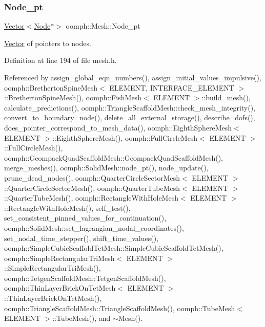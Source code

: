 \subsubsection{\texorpdfstring{Node\+\_\+pt}{Node\_pt}}
{\footnotesize\ttfamily \hyperlink{classoomph_1_1Vector}{Vector}$<$\hyperlink{classoomph_1_1Node}{Node}$\ast$$>$ oomph\+::\+Mesh\+::\+Node\+\_\+pt\hspace{0.3cm}{\ttfamily [protected]}}



\hyperlink{classoomph_1_1Vector}{Vector} of pointers to nodes. 



Definition at line 194 of file mesh.\+h.



Referenced by assign\+\_\+global\+\_\+eqn\+\_\+numbers(), assign\+\_\+initial\+\_\+values\+\_\+impulsive(), oomph\+::\+Bretherton\+Spine\+Mesh$<$ E\+L\+E\+M\+E\+N\+T, I\+N\+T\+E\+R\+F\+A\+C\+E\+\_\+\+E\+L\+E\+M\+E\+N\+T $>$\+::\+Bretherton\+Spine\+Mesh(), oomph\+::\+Fish\+Mesh$<$ E\+L\+E\+M\+E\+N\+T $>$\+::build\+\_\+mesh(), calculate\+\_\+predictions(), oomph\+::\+Triangle\+Scaffold\+Mesh\+::check\+\_\+mesh\+\_\+integrity(), convert\+\_\+to\+\_\+boundary\+\_\+node(), delete\+\_\+all\+\_\+external\+\_\+storage(), describe\+\_\+dofs(), does\+\_\+pointer\+\_\+correspond\+\_\+to\+\_\+mesh\+\_\+data(), oomph\+::\+Eighth\+Sphere\+Mesh$<$ E\+L\+E\+M\+E\+N\+T $>$\+::\+Eighth\+Sphere\+Mesh(), oomph\+::\+Full\+Circle\+Mesh$<$ E\+L\+E\+M\+E\+N\+T $>$\+::\+Full\+Circle\+Mesh(), oomph\+::\+Geompack\+Quad\+Scaffold\+Mesh\+::\+Geompack\+Quad\+Scaffold\+Mesh(), merge\+\_\+meshes(), oomph\+::\+Solid\+Mesh\+::node\+\_\+pt(), node\+\_\+update(), prune\+\_\+dead\+\_\+nodes(), oomph\+::\+Quarter\+Circle\+Sector\+Mesh$<$ E\+L\+E\+M\+E\+N\+T $>$\+::\+Quarter\+Circle\+Sector\+Mesh(), oomph\+::\+Quarter\+Tube\+Mesh$<$ E\+L\+E\+M\+E\+N\+T $>$\+::\+Quarter\+Tube\+Mesh(), oomph\+::\+Rectangle\+With\+Hole\+Mesh$<$ E\+L\+E\+M\+E\+N\+T $>$\+::\+Rectangle\+With\+Hole\+Mesh(), self\+\_\+test(), set\+\_\+consistent\+\_\+pinned\+\_\+values\+\_\+for\+\_\+continuation(), oomph\+::\+Solid\+Mesh\+::set\+\_\+lagrangian\+\_\+nodal\+\_\+coordinates(), set\+\_\+nodal\+\_\+time\+\_\+stepper(), shift\+\_\+time\+\_\+values(), oomph\+::\+Simple\+Cubic\+Scaffold\+Tet\+Mesh\+::\+Simple\+Cubic\+Scaffold\+Tet\+Mesh(), oomph\+::\+Simple\+Rectangular\+Tri\+Mesh$<$ E\+L\+E\+M\+E\+N\+T $>$\+::\+Simple\+Rectangular\+Tri\+Mesh(), oomph\+::\+Tetgen\+Scaffold\+Mesh\+::\+Tetgen\+Scaffold\+Mesh(), oomph\+::\+Thin\+Layer\+Brick\+On\+Tet\+Mesh$<$ E\+L\+E\+M\+E\+N\+T $>$\+::\+Thin\+Layer\+Brick\+On\+Tet\+Mesh(), oomph\+::\+Triangle\+Scaffold\+Mesh\+::\+Triangle\+Scaffold\+Mesh(), oomph\+::\+Tube\+Mesh$<$ E\+L\+E\+M\+E\+N\+T $>$\+::\+Tube\+Mesh(), and $\sim$\+Mesh().

